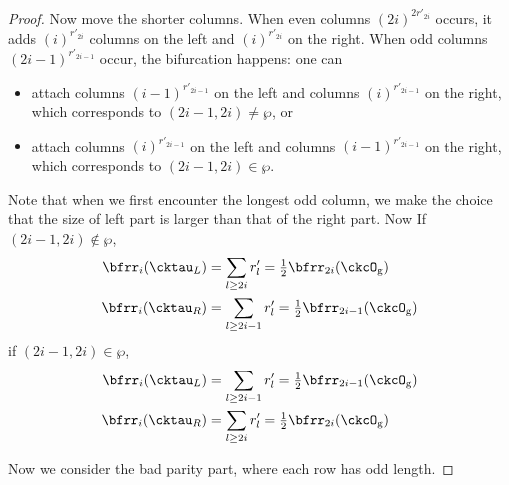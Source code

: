 \documentclass[12pt,a4paper]{amsart}
\def\abs#1{\left|{#1}\right|}
\newcommand{\sgn}{\operatorname{sgn}}
\numberwithin{equation}{section}
\theoremstyle{remark}
\def\half{{\tfrac{1}{2}}}
\begin{document}
\begin{proof}
{{      Now move the shorter columns. When even columns $(2i)^{2r'_{2i}}$
      occurs, it adds $(i)^{r'_{2i}}$ columns on the left and $(i)^{r'_{2i}}$ on
      the right. When odd columns $(2i-1)^{r'_{2i-1}}$ occur, the bifurcation
      happens: one can
      \begin{itemize}
        \item attach columns $(i-1)^{r'_{2i-1}}$ on the left and columns
              $(i)^{r'_{2i-1}}$ on the right, which corresponds to
              $(2i-1,2i)\neq \wp$, or
        \item attach columns $(i)^{r'_{2i-1}}$ on the left and columns
              $(i-1)^{r'_{2i-1}}$ on the right, which corresponds to
              $(2i-1,2i)\in \wp$.
      \end{itemize}
      Note that when we first encounter the longest odd column, we make the
      choice that the size of left part is larger than that of the right part.
      Now If $(2i-1,2i)\notin \wp$,
      \[
        \begin{split}
          \bfrr_{i}(\cktau_{L}) & = \sum_{l\geq 2i} r'_{l}
          = \half\bfrr_{2i}(\ckcO_{\mathrm g})\\
          \bfrr_{i}(\cktau_{R}) & = \sum_{l\geq 2i-1} r'_{l} = \half\bfrr_{2i-1}(\ckcO_{\mathrm g})
        \end{split}
      \]
      if $(2i-1,2i)\in \wp$,
      \[
        \begin{split}
          \bfrr_{i}(\cktau_{L}) & = \sum_{l\geq 2i-1} r'_{l}
          = \half\bfrr_{2i-1}(\ckcO_{\mathrm g})\\
          \bfrr_{i}(\cktau_{R}) & = \sum_{l\geq 2i} r'_{l} = \half\bfrr_{2i}(\ckcO_{\mathrm g})
        \end{split}
      \]
    }


    Now we consider the bad parity part, where each row has
    odd length.



}
\end{proof}
\end{document}
